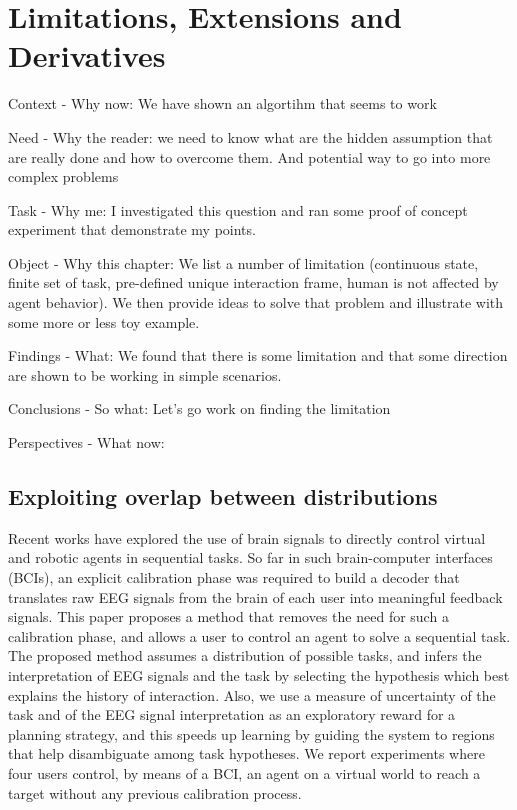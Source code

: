 
%
\chapter{Limitations, Extensions and Derivatives}
\label{chapter:limitations}
\minitoc

Context - Why now: We have shown an algortihm that seems to work

Need - Why the reader: we need to know what are the hidden assumption that are really done and how to overcome them. And potential way to go into more complex problems

Task - Why me: I investigated this question and ran some proof of concept experiment that demonstrate my points.

Object - Why this chapter: We list a number of limitation (continuous state, finite set of task, pre-defined unique interaction frame, human is not affected by agent behavior). We then provide ideas to solve that problem and illustrate with some more or less toy example.

Findings - What: We found that there is some limitation and that some direction are shown to be working in simple scenarios.

Conclusions - So what: Let's go work on finding the limitation

Perspectives - What now: 


\section{Exploiting overlap between distributions}
\label{chapter:limitations:overlap}


Recent works have explored the use of brain signals to directly control virtual and robotic agents in sequential tasks. So far in such brain-computer interfaces (BCIs), an explicit calibration phase was required to build a decoder that translates raw EEG signals from the brain of each user into meaningful feedback signals.
%
This paper proposes a method that removes the need for such a calibration phase, and allows a user to control an agent to solve a sequential task.
%
The proposed method assumes a distribution of possible tasks, and infers the interpretation of EEG signals and the task by selecting the hypothesis which best explains the history of interaction. 
%
Also, we use a measure of uncertainty of the task and of the EEG signal interpretation as an exploratory reward for a planning strategy, and this speeds up learning by guiding the system to regions that help disambiguate among task hypotheses.
%
We report experiments where four users control, by means of a BCI, an agent on a virtual world to reach a target without any previous calibration process.

